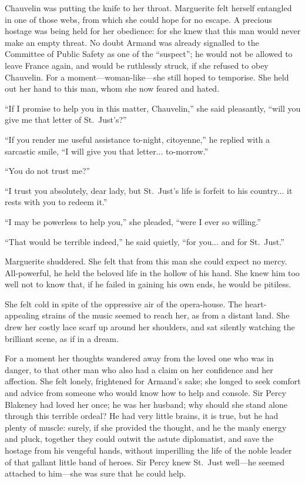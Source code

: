 \documentclass[paper=5.5in:8.5in,BCOR=7mm,twoside,DIV=calc,12pt,usegeometry,chapterprefix,endperiod,headings=big]{scrbook}
\begin{document}
Chauvelin was putting the knife to her throat. Marguerite felt herself entangled in one of those webs, from which she could hope for no escape. A precious hostage was being held for her obedience: for she knew that this man would never make an empty threat. No doubt Armand was already signalled to the Committee of Public Safety as one of the \enquote{suspect}; he would not be allowed to leave France again, and would be ruthlessly struck, if she refused to obey Chauvelin. For a moment---woman-like---she still hoped to temporise. She held out her hand to this man, whom she now feared and hated.

\enquote{If I promise to help you in this matter, Chauvelin,} she said pleasantly, \enquote{will you give me that letter of St.~Just's?}

\enquote{If you render me useful assistance to-night, citoyenne,} he replied with a sarcastic smile, \enquote{I will give you that letter... to-morrow.}

\enquote{You do not trust me?}

\enquote{I trust you absolutely, dear lady, but St.~Just's life is forfeit to his country... it rests with you to redeem it.}

\enquote{I may be powerless to help you,} she pleaded, \enquote{were I ever so willing.}

\enquote{That would be terrible indeed,} he said quietly, \enquote{for you... and for St.~Just.}

Marguerite shuddered. She felt that from this man she could expect no mercy. All-powerful, he held the beloved life in the hollow of his hand. She knew him too well not to know that, if he failed in gaining his own ends, he would be pitiless.

She felt cold in spite of the oppressive air of the opera-house. The heart-appealing strains of the music seemed to reach her, as from a distant land. She drew her costly lace scarf up around her shoulders, and sat silently watching the brilliant scene, as if in a dream.

For a moment her thoughts wandered away from the loved one who was in danger, to that other man who also had a claim on her confidence and her affection. She felt lonely, frightened for Armand's sake; she longed to seek comfort and advice from someone who would know how to help and console. Sir Percy Blakeney had loved her once; he was her husband; why should she stand alone through this terrible ordeal? He had very little brains, it is true, but he had plenty of muscle: surely, if she provided the thought, and he the manly energy and pluck, together they could outwit the astute diplomatist, and save the hostage from his vengeful hands, without imperilling the life of the noble leader of that gallant little band of heroes. Sir Percy knew St.~Just well---he seemed attached to him---she was sure that he could help.
\end{document}
